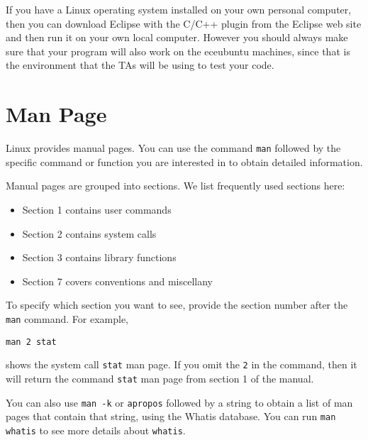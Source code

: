 If you have a Linux operating system installed on your own personal computer, then you can download Eclipse with the C/C++ plugin from the Eclipse web site and then run it on your own local computer. However you should always make sure that your program will also work on the eceubuntu machines, since that is the environment that the TAs will be using to test your code.

\section{Man Page}
Linux provides manual pages. You can use the command \verb+man+ followed by the specific command or function you are interested in to obtain detailed information. 

Manual pages are grouped into sections. We list frequently used sections here: 
\begin{itemize}
\item Section 1 contains user commands
\item Section 2 contains system calls
\item Section 3 contains library functions
\item Section 7 covers conventions and miscellany
\end{itemize}

To specify which section you want to see, provide the section number after the \verb+man+ command. For example,
\begin{lstlisting}[style=bash]
man 2 stat
\end{lstlisting}
shows the system call \verb+stat+ man page. If you omit the \verb+2+ in the command, then it will return the command \verb+stat+ man page from section 1 of the manual.

You can also use \verb+man -k+  or \verb+apropos+ followed by a string to obtain a list of man pages that contain that string, using the Whatis database. You can run \verb+man whatis+ to see more details about \verb+whatis+.

